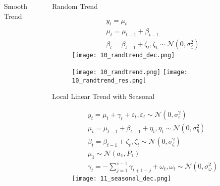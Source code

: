 \documentclass{beamer}
\begin{document}
\begin{frame}[fragile]
\begin{columns}[T]
\begin{column}{.32\textwidth}
\begin{columns}[T]
\begin{column}{.5\textwidth}
\begin{block}{Smooth Trend}
\end{block}
\end{column}

\end{columns}
\end{column}

\begin{column}{.32\textwidth}

\begin{block}{Random Trend}

\begin{figure}[htb]
\begin{gather*}
y_t = \mu_t
\\
\mu_t = \mu_{t-1} + \beta_{t-1}
\\
\beta_t = \beta_{t-1} + \zeta_t, \zeta_t \sim \mathcal{N}(0, \sigma_\zeta^2)
\end{gather*}
\endminipage \hfill
{}
\texttt{[image: 10\_randtrend\_dec.png]}
\endminipage\hfill
\end{figure}

\begin{figure}[htb]
  \texttt{[image: 10\_randtrend.png]}
\endminipage\hfill
{}
  \texttt{[image: 10\_randtrend\_res.png]}
\endminipage\hfill
\end{figure}
\end{block}

\begin{block}{Local Linear Trend with Seasonal}

\begin{figure}[htb]
\begin{gather*}
y_t = \mu_t + \gamma_t + \varepsilon_t,  \varepsilon_t \sim \mathcal{N}(0, \sigma_\varepsilon^2)
\\
\mu_t = \mu_{t-1} + \beta_{t-1} + \eta_t, \eta_t \sim \mathcal{N}(0, \sigma^2_\eta)
\\
\beta_t = \beta_{t-1} + \zeta_t, \zeta_t \sim \mathcal{N}(0, \sigma_\zeta^2)
\\
\mu_1 \sim \mathcal{N}(a_1, P_1) 
\\
\gamma_t = - \sum_{j=1}^{s-1} \gamma_{t+1-j} + \omega_t, \omega_t \sim \mathcal{N}(0, \sigma_\omega^2)
\end{gather*}
\endminipage \hfill
{}
\texttt{[image: 11\_seasonal\_dec.png]}
\endminipage\hfill
\end{figure}


\end{block}
\end{column}
\end{columns}
\end{frame}
\end{document}
